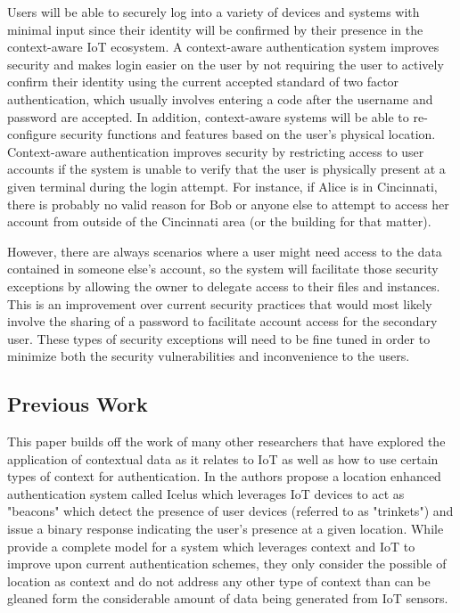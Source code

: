 \documentclass[11pt,journal]{IEEEtran}
\begin{document}
Users will be able to securely log into a variety of devices and systems with minimal input since their identity will be confirmed by their presence in the context-aware IoT ecosystem.  A context-aware authentication system improves security and makes login easier on the user by not requiring the user to actively confirm their identity using the current accepted standard of two factor authentication, which usually involves entering a code after the username and password are accepted.  In addition, context-aware systems will be able to re-configure security functions and features based on the user’s physical location.  Context-aware authentication improves security by restricting access to user accounts if the system is unable to verify that the user is physically present at a given terminal during the login attempt.  For instance, if Alice is in Cincinnati, there is probably no valid reason for Bob or anyone else to attempt to access her account from outside of the Cincinnati area (or the building for that matter). 

However, there are always scenarios where a user might need access to the data contained in someone else’s account, so the system will facilitate those security exceptions by allowing the owner to delegate access to their files and instances.  This is an improvement over current security practices that would most likely involve the sharing of a password to facilitate account access for the secondary user.  These types of security exceptions will need to be fine tuned in order to minimize both the security vulnerabilities and inconvenience to the users.

\subsection{Previous Work}
This paper builds off the work of many other researchers that have explored the application of contextual data as it relates to IoT as well as how to use certain types of context for authentication.  In \citet{Agadakos:2016:LAU:2991079.2991090} the authors propose a location enhanced authentication system called Icelus which leverages IoT devices to act as "beacons" which detect the presence of user devices (referred to as "trinkets") and issue a binary response indicating the user's presence at a given location.  While \citeauthor{Agadakos:2016:LAU:2991079.2991090} provide a complete model for a system which leverages context and IoT to improve upon current authentication schemes, they only consider the possible of location as context and do not address any other type of context than can be gleaned form the considerable amount of data being generated from IoT sensors.
\end{document}
